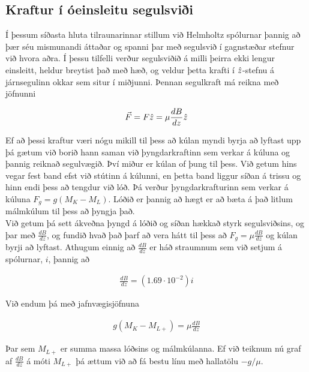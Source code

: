 \documentclass[11pt]{article}
\begin{document}
\subsection{Kraftur í óeinsleitu segulsviði}
Í þessum síðasta hluta tilraunarinnar stillum við Helmholtz spólurnar þannig að þær séu mismunandi áttaðar og spanni þar með segulsvið í gagnstæðar stefnur við hvora aðra. Í þessu tilfelli verður segulsviðið á milli þeirra ekki lengur einsleitt, heldur breytist það með hæð, og veldur þetta krafti í $\Hat{z}$-stefnu á járnsegulinn okkar sem situr í miðjunni. Þennan segulkraft má reikna með jöfnunni

\begin{align}
\Vec{F} = F\Hat{z} = \mu \frac{dB}{dz}\Hat{z}
\end{align}

Ef að þessi kraftur væri nógu mikill til þess að kúlan myndi byrja að lyftast upp þá gætum við borið hann saman við þyngdarkraftinn sem verkar á kúluna og þannig reiknað segulvægið. Því miður er kúlan of þung til þess. Við getum hins vegar fest band efst við stútinn á kúlunni, en þetta band liggur síðan á trissu og hinn endi þess að tengdur við lóð. Þá verður þyngdarkrafturinn sem verkar á kúluna $F_g = g(M_K - M_L)$. Lóðið er þannig að hægt er að bæta á það litlum málmkúlum til þess að þyngja það.\\
Við getum þá sett ákveðna þyngd á lóðið og síðan hækkað styrk segulsviðsins, og þar með $\frac{dB}{dz}$, og fundið hvað það þarf að vera hátt til þess að $F_g = \mu \frac{dB}{dz}$ og kúlan byrji að lyftast. Athugum einnig að $\frac{dB}{dz}$ er háð straumnum sem við setjum á spólurnar, $i$, þannig að

\begin{align}
\frac{dB}{dz} = (1.69 \cdot 10^{-2})i
\end{align}

Við endum þá með jafnvægisjöfnuna 

\begin{align}
g(M_K - M_{L+}) = \mu \frac{dB}{dz}
\end{align}
 
 Þar sem $M_{L+}$ er summa massa lóðsins og málmkúlanna. Ef við teiknum nú graf af $\frac{dB}{dz}$ á móti $M_{L+}$ þá ættum við að fá bestu línu með hallatölu $-g/\mu$.
 
\end{document}
